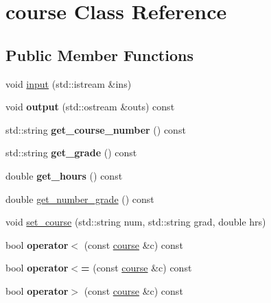 \hypertarget{classcourse}{}\section{course Class Reference}
\label{classcourse}
\subsection*{Public Member Functions}
\begin{DoxyCompactItemize}
\item 
void \hyperlink{classcourse_a0a8839f2369903101399bca60547aed2}{input} (std\+::istream \&ins)
\item 
\mbox{\label{classcourse_afdd5ccf71bbbb7797b75854f16bf373f}} 
void {\bfseries output} (std\+::ostream \&outs) const
\item 
\mbox{\label{classcourse_a8b2f74ab01eae52d779979887fc3b079}} 
std\+::string {\bfseries get\+\_\+course\+\_\+number} () const
\item 
\mbox{\label{classcourse_a5008b6a7c44047fefa1c7779b771aad4}} 
std\+::string {\bfseries get\+\_\+grade} () const
\item 
\mbox{\label{classcourse_a09f7b2b40cbbb81c94e0642d5b13663e}} 
double {\bfseries get\+\_\+hours} () const
\item 
double \hyperlink{classcourse_aad43a6b7ce264bd4038472fc3e40cf16}{get\+\_\+number\+\_\+grade} () const
\item 
void \hyperlink{classcourse_a1fce1a16efb3f07d0da5daca8005e4a6}{set\+\_\+course} (std\+::string num, std\+::string grad, double hrs)
\item 
\mbox{\label{classcourse_aa47eab66d21e10a44ff77f634406face}} 
bool {\bfseries operator$<$} (const \hyperlink{classcourse}{course} \&c) const
\item 
\mbox{\label{classcourse_ab96de818d7b97e4e259fc6add5e0bc54}} 
bool {\bfseries operator$<$=} (const \hyperlink{classcourse}{course} \&c) const
\item 
\mbox{\label{classcourse_a16df685718a7ca9e98408b65109897b6}} 
bool {\bfseries operator$>$} (const \hyperlink{classcourse}{course} \&c) const

\end{DoxyCompactItemize}
